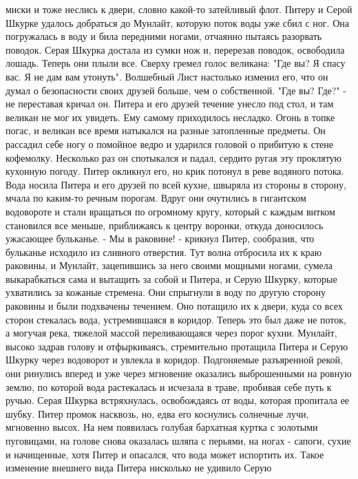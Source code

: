 миски и тоже неслись к двери, словно какой-то затейливый флот.
    Питеру и Серой Шкурке удалось добраться до Мунлайт, которую поток 
воды уже сбил с ног. Она погружалась в воду и била передними ногами, 
отчаянно пытаясь разорвать поводок. Серая Шкурка достала из сумки нож 
и, перерезав поводок, освободила лошадь.
    Теперь они плыли все. Сверху гремел голос великана: "Где вы? Я 
спасу вас. Я не дам вам утонуть". Волшебный Лист настолько изменил 
его, что он думал о безопасности своих друзей больше, чем о 
собственной. "Где вы? Где?" - не переставая кричал он.
    Питера и его друзей течение унесло под стол, и там великан не мог 
их увидеть. Ему самому приходилось несладко. Огонь в топке погас, и 
великан все время натыкался на разные затопленные предметы. Он 
рассадил себе ногу о помойное ведро и ударился головой о прибитую к 
стене кофемолку. Несколько раз он спотыкался и падал, сердито ругая 
эту проклятую кухонную погоду.
    Питер окликнул его, но крик потонул в реве водяного потока. Вода 
носила Питера и его друзей по всей кухне, швыряла из стороны в 
сторону, мчала по каким-то речным порогам. Вдруг они очутились в 
гигантском водовороте и стали вращаться по огромному кругу, который с 
каждым витком становился все меньше, приближаясь к центру воронки, 
откуда доносилось ужасающее бульканье.
    - Мы в раковине! - крикнул Питер, сообразив, что бульканье 
исходило из сливного отверстия. Тут волна отбросила их к краю 
раковины, и Мунлайт, зацепившись за него своими мощными ногами, сумела 
выкарабкаться сама и вытащить за собой и Питера, и Серую Шкурку, 
которые ухватились за кожаные стремена. Они спрыгнули в воду по другую 
сторону раковины и были подхвачены течением. Оно потащило их к двери, 
куда со всех сторон стекалась вода, устремившаяся в коридор.
    Теперь это был даже не поток, а могучая река, тяжелой массой 
переливающаяся через порог кухни. Мунлайт, высоко задрав голову и 
отфыркиваясъ, стремительно протащила Питера и Серую Шкурку через 
водоворот и увлекла в коридор. Подгоняемые разъяренной рекой, они 
ринулись вперед и уже через мгновение оказались выброшенными на ровную 
землю, по которой вода растекалась и исчезала в траве, пробивая себе 
путь к ручью.
    Серая Шкурка встряхнулась, освобождаясь от воды, которая пропитала 
ее шубку. Питер промок насквозь, но, едва его коснулись солнечные 
лучи, мгновенно высох. На нем появилась голубая бархатная куртка с 
золотыми пуговицами, на голове снова оказалась шляпа с перьями, на 
ногах - сапоги, сухие и начищенные, хотя Питер и опасался, что вода 
может испортить их.
    Такое изменение внешнего вида Питера нисколько не удивило Серую 
